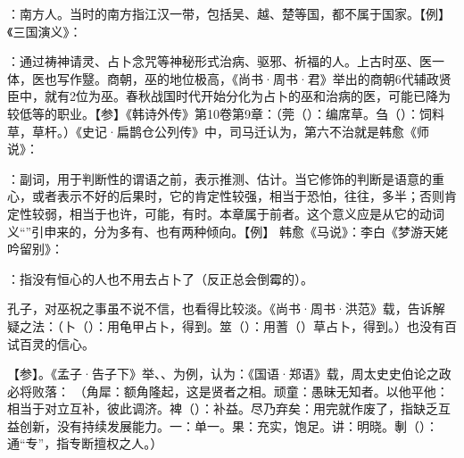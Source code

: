 {
\begin{lyitemize}
\item {}：南方人。当时的南方指江汉一带，包括吴、越、楚等国，都不属于国家。【例】《三国演义》：
\item {}：通过祷神请灵、占卜念咒等神秘形式治病、驱邪、祈福的人。上古时巫、医一体，医也写作毉。商朝，巫的地位极高，《尚书·周书·君》举出的商朝6代辅政贤臣中，就有2位为巫。春秋战国时代开始分化为占卜的巫和治病的医，可能已降为较低等的职业。【参】《韩诗外传》第10卷第9章：（莞（）：编席草。刍（）：饲料草，草杆。）《史记·扁鹊仓公列传》中，司马迁认为，第六不治就是韩愈《师说》：

\item {}：副词，用于判断性的谓语之前，表示推测、估计。当它修饰的判断是语意的重心，或者表示不好的后果时，它的肯定性较强，相当于恐怕，往往，多半；否则肯定性较弱，相当于也许，可能，有时。本章属于前者。这个意义应是从它的动词义“”引申来的，分为多有、也有两种倾向。【例】   韩愈《马说》：李白《梦游天姥吟留别》： %

\item {}：指没有恒心的人也不用去占卜了（反正总会倒霉的）。%
\end{lyitemize}
孔子，对巫祝之事虽不说不信，也看得比较淡。《尚书·周书·洪范》载，告诉解疑之法：（卜（）：用龟甲占卜，得到。筮（）：用蓍（）草占卜，得到。）也没有百试百灵的信心。
}
{}


{
【参】。《孟子·告子下》举、、为例，认为：《国语·郑语》载，周太史史伯论之政必将败落：
（角犀：额角隆起，这是贤者之相。顽童：愚昧无知者。以他平他：相当于对立互补，彼此调济。裨（）：补益。尽乃弃矣：用完就作废了，指缺乏互益创新，没有持续发展能力。一：单一。果：充实，饱足。讲：明晓。剸（）：通“专”，指专断擅权之人。）
}
{}


